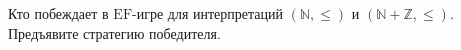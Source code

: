 Кто побеждает в $\mathrm{EF}$-игре для интерпретаций $(\mathbb{N}, \le)$ и
$(\mathbb{N} + \mathbb{Z}, \le)$.  Предъявите стратегию победителя.
